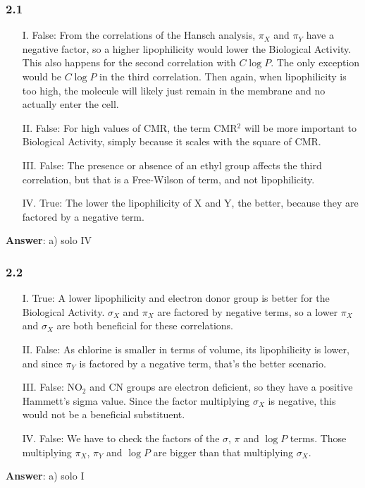 \documentclass[a4paper, 12pt, notitlepage]{article}
\begin{document}
\subsubsection*{2.1}
\begin{itemize}
	\item[I.] False: From the correlations of the Hansch analysis, $\pi_X$ and $\pi_Y$ have a negative factor, so a higher lipophilicity would lower the Biological Activity. This also happens for the second correlation with $C\log P$. The only exception would be $C\log P$ in the third correlation. Then again, when lipophilicity is too high, the molecule will likely just remain in the membrane and no actually enter the cell.
	\item[II.] False: For high values of CMR, the term CMR$^2$ will be more important to Biological Activity, simply because it scales with the square of CMR.
	\item[III.] False: The presence or absence of an ethyl group affects the third correlation, but that is a Free-Wilson of term, and not lipophilicity.
	\item[IV.] True: The lower the lipophilicity of X and Y, the better, because they are factored by a negative term.
\end{itemize}
\textbf{Answer}: a) solo IV

\subsubsection*{2.2}
\begin{itemize}
	\item[I.] True: A lower lipophilicity and electron donor group is better for the Biological Activity. $\sigma_X$ and $\pi_X$ are factored by negative terms, so a lower $\pi_X$ and $\sigma_X$ are both beneficial for these correlations.
	\item[II.] False: As chlorine is smaller in terms of volume, its lipophilicity is lower, and since $\pi_Y$ is factored by a negative term, that's the better scenario.
	\item[III.] False: NO$_\text{2}$ and CN groups are electron deficient, so they have a positive Hammett's sigma value. Since the factor multiplying $\sigma_X$ is negative, this would not be a beneficial substituent.
	\item[IV.] False: We have to check the factors of the $\sigma$, $\pi$ and $\log P$ terms. Those multiplying $\pi_{X}$, $\pi_Y$ and $\log P$ are bigger than that multiplying $\sigma_X$.
\end{itemize}
\textbf{Answer}: a) solo I
\end{document}
